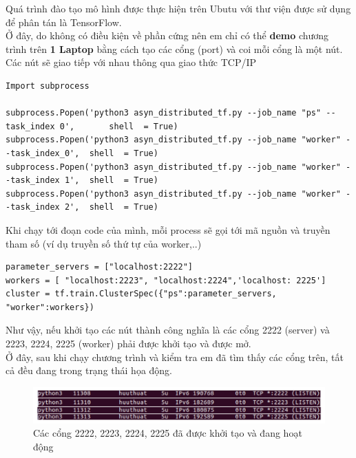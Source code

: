 \documentclass[11pt,a4paper]{article}
\numberwithin{equation}{subsection}
\numberwithin{figure}{subsection}
\numberwithin{table}{subsection}
\begin{document}
Quá trình đào tạo mô hình được thực hiện trên Ubutu với thư viện được sử dụng để phân tán là TensorFlow. \\

Ở đây, do không có điều kiện về phần cứng nên em chỉ có thể \textbf{demo} chương trình trên \textbf{1 Laptop} bằng cách tạo các cổng (port) và coi mỗi cổng là một nút. Các nút sẽ giao tiếp với nhau thông qua giao thức TCP/IP

\lstset{language=Python}
\lstset{frame=lines}
\lstset{basicstyle=\footnotesize}
\begin{lstlisting}
Import subprocess

subprocess.Popen('python3 asyn_distributed_tf.py --job_name "ps" --task_index 0',    	shell  = True)
subprocess.Popen('python3 asyn_distributed_tf.py --job_name "worker" --task_index_0',  shell  = True)
subprocess.Popen('python3 asyn_distributed_tf.py --job_name "worker" --task_index 1',  shell  = True)
subprocess.Popen('python3 asyn_distributed_tf.py --job_name "worker" --task_index 2',  shell  = True)
\end{lstlisting}

Khi chạy tới đoạn code của mình, mỗi process sẽ gọi tới mã nguồn và truyền tham số (ví dụ truyền số thứ tự của worker,..)

\lstset{language=Python}
\lstset{frame=lines}
\lstset{basicstyle=\footnotesize}
\begin{lstlisting}
parameter_servers = ["localhost:2222"]
workers = [ "localhost:2223", "localhost:2224",'localhost: 2225']
cluster = tf.train.ClusterSpec({"ps":parameter_servers, "worker":workers})
\end{lstlisting}

Như vậy, nếu khởi tạo các nút thành công nghĩa là các cổng 2222 (server) và 2223, 2224, 2225 (worker) phải được khởi tạo và được mở.\\

Ở đây, sau khi chạy chương trình và kiểm tra em đã tìm thấy các cổng trên, tất cả đều đang trong trạng thái họa động.

\begin{figure}[!h]
	\begin{center}
		\includegraphics[scale=0.65]{IP.PNG}
	\end{center}
	\caption{Các cổng 2222, 2223, 2224, 2225 đã được khởi tạo và đang hoạt động}
\end{figure}
\end{document}
